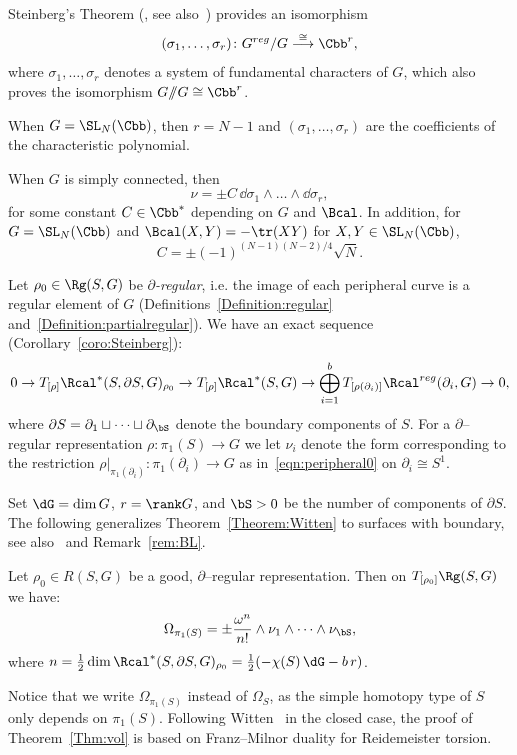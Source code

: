 Steinberg's Theorem (\cite{SteinbergIHES}, see also~\cite{Steinberg,Popov}) provides an isomorphism
\[
(\sigma_1,\dots,\sigma_r)\colon G^{reg}/ G\overset{\cong} \longrightarrow \Cbb^r,
\]
where $\sigma_1,\dots, \sigma_r$ denotes a system of fundamental characters of $G$, which also proves the isomorphism $G /\!\!/ G \cong \Cbb^r$.

When $G=\SL_N (\Cbb)$, then $r=N-1$ and $(\sigma_1,\dots,\sigma_r)$ are the coefficients of the characteristic polynomial.


\begin{prop}\label{prop:Steinberg}
When $G$ is simply connected, then
\[
\nu= \pm C\, \dd\sigma_1\wedge\dots \wedge \dd\sigma_r,
\]
for some constant $C\in\Cbb^*$ depending on $G$ and $\Bcal$. In addition, for $G=\SL_N (\Cbb)$ and $\Bcal(X,Y)=- \tr(XY)$ for $X,Y\in \SL_N (\Cbb)$,
\[
C=\pm (-1)^{(N-1)(N-2)/4}\sqrt{N}.
\]
\end{prop}


Let $\rho_0\in \Rg(S,G) $ be \emph{$\partial$-regular}, i.e. the image of each peripheral curve is a regular element of $G$ (Definitions~\ref{Definition:regular} and~\ref{Definition:partialregular}). We have an exact sequence (Corollary~\ref{coro:Steinberg}):
\[
0\to T_{[\rho]}\Rcal^*(S,\partial S,G)_{\rho_0} \to T_{[\rho]}\Rcal^*(S,G) \to \bigoplus_{i=1}^b T_{[\rho(\partial_i)]} \Rcal^{reg}(\partial_i, G)
\to 0,
\]
where $\partial S=\partial_1\sqcup\dots\sqcup \partial_\bS$ denote the boundary components of $S$. For a $\partial$--regular representation $\rho\colon\pi_1(S)\to G$ we let $\nu_i$ denote the form corresponding to the restriction $\rho|_{\pi_1(\partial_i)}\colon \pi_1(\partial_i)\to G$ as in~\eqref{eqn:peripheral0} on $\partial_i\cong S^1$.

Set $\dG=\dim G$, $r=\rank G$, and $\bS>0$ be the number of components of $\partial S$. The following generalizes Theorem~\ref{Theorem:Witten} to surfaces with boundary, \cite{Witten} see also~\cite[Theorem~5.40]{BL} and Remark~\ref{rem:BL}.


\begin{theo}\label{Thm:vol}
Let $\rho_0\in R(S,G)$ be a good, $\partial$--regular representation. Then on $T_{[\rho_0]} \Rg(S,G)$ we have:
\[
\Omega_{\pi_1(S)}=\pm
\frac{\omega^n}{n!}\wedge \nu_1\wedge\dots\wedge\nu_\bS,
\]
where $n = \frac{1}{2} \dim \Rcal^*(S,\partial S,G)_{\rho_0} = \frac12(-\chi(S)\, \dG - b\, r)$.
\end{theo}

Notice that we write $\Omega_{\pi_1(S)}$ instead of $\Omega_{S}$, as the simple homotopy type of $S$ only depends on $\pi_1(S)$. Following Witten~\cite{Witten} in the closed case, the proof of Theorem~\ref{Thm:vol} is based on Franz--Milnor duality for Reidemeister torsion.

